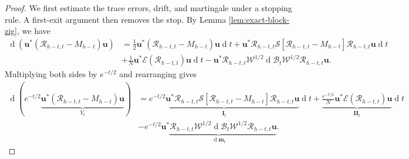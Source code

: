 \documentclass[11pt,reqno]{amsart}
\def\u{\mathbf{u}}
\def\m{\mathbf{m}}
\def\cB{\mathcal{B}}
\def\cE{\mathcal{E}}
\def\cR{\mathcal{R}}
\def\cW{\mathcal{W}}
\def\cS{\mathcal{S}}
\def\de{\operatorname{d}}
\theoremstyle{definition}
\numberwithin{equation}{section}
\numberwithin{figure}{section}
\begin{document}
\begin{proof}
We first estimate the trace errors, drift, and martingale under a stopping
rule.  A first-exit argument then removes the stop. By Lemma 
\ref{lem:exact-block-zig}, we have
\begin{align*}
  \de(\u^*(\cR_{h-t,t}-M_{h-t})\u)&=\frac{1}{2}\u^*(\cR_{h-t,t}-M_{h-t})\u\de t
  +\u^*\cR_{h-t,t}\cS[\cR_{h-t,t}-M_{h-t}]\cR_{h-t,t}\u\de t\\
  &+\frac{1}{N}\u^*\cE(\cR_{h-t,t})\u\de t
  -\u^*\cR_{h-t,t}\cW^{1/2}\de\cB_t\cW^{1/2}\cR_{h-t,t}\u.
\end{align*}
Multiplying both sides by $e^{-t/2}$ and rearranging gives
\begin{align*}
  \de(e^{-t/2}\underbrace{\u^*(\cR_{h-t,t}-M_{h-t})\u}_{Y_t})&=\underbrace{e^{-t/2}
  \u^*\cR_{h-t,t}\cS[\cR_{h-t,t}-M_{h-t}]\cR_{h-t,t}\u}_{\mathbf{I}_t}\de t
  +\underbrace{\frac{e^{-t/2}}{N}\u^*\cE(\cR_{h-t,t})\u}_{\mathbf{II}_t}\de t\\
  &-e^{-t/2}\underbrace{\u^*\cR_{h-t,t}\cW^{1/2}\de\cB_t\cW^{1/2}
  \cR_{h-t,t}\u}_{\de \m_t}.
\end{align*}


\end{proof}
\end{document}
